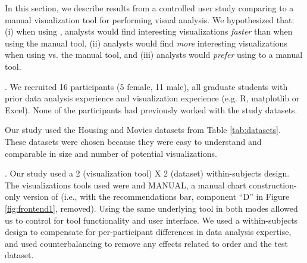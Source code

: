 In this section, we describe results from a controlled user study comparing 
\SeeDB to a manual visualization tool for performing visual analysis. 
We hypothesized that: (i) when using \SeeDB, analysts would find interesting 
visualizations {\em faster} than when using the manual tool, (ii) analysts
would find {\it more} interesting visualizations when using \SeeDB vs. the 
manual tool, and (iii) analysts would {\em prefer} using \SeeDB to a manual tool.


. We recruited 16 participants (5 female, 11
 male), all graduate students with prior data analysis experience and visualization
 experience (e.g. R, matplotlib or Excel).
 None of the participants had previously worked with the study datasets.

 Our study used the Housing and Movies datasets from 
 Table \ref{tab:datasets}.
 These  datasets were chosen because they were easy to understand and 
  comparable in size and number of potential visualizations.
 
.
Our study used a 2 (visualization tool) X 2 (dataset) within-subjects design.
The visualizations tools used were \SeeDB and MANUAL, a manual chart
construction-only version of \SeeDB (i.e., \SeeDB with the recommendations bar, 
component ``D'' in Figure \ref{fig:frontend1}, removed).
Using the same underlying tool in both modes allowed us to control for
tool functionality and user interface.
We used a within-subjects design to compensate for per-participant differences 
in data analysis expertise, and used counterbalancing to remove any effects 
related to order and the test dataset.

